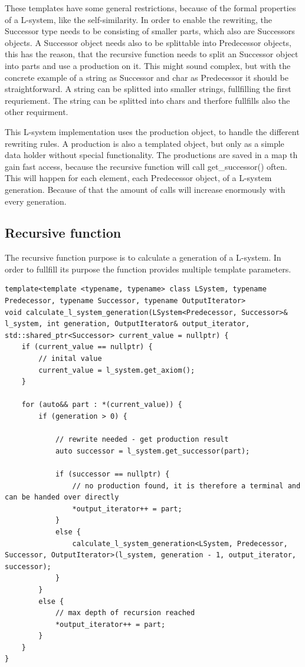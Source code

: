 \documentclass[english]{cpp-hmwk}
\begin{document}
\noindent These templates have some general restrictions, because of the formal properties of a L-system, like the self-similarity. In order to enable the rewriting, the Successor type needs to be consisting of smaller parts, which also are Successors objects. A Successor object needs also to be splittable into Predecessor objects, this has the reason, that the recursive function needs to split an Successor object into parts and use a production on it.
This might sound complex, but with the concrete example of a string as Successor and char as Predecessor it should be straightforward. A string can be splitted into smaller strings, fullfilling the first requriement. The string can be splitted into chars and therfore fullfills also the other requirment.

This L-system implementation uses the production object, to handle the different rewriting rules. A production is also a templated object, but only as a simple data holder without special functionality. The productions are saved in a map th gain fast access, because the recursive function will call get\_successor() often. This will happen for each element, each Predecessor object, of a L-system generation. Because of that the amount of calls will increase enormously with every generation.

\subsection{Recursive function}
The recursive function purpose is to calculate a generation of a L-system. In order to fullfill its purpose the function provides multiple template parameters.

\medskip
\begin{lstlisting}
template<template <typename, typename> class LSystem, typename Predecessor, typename Successor, typename OutputIterator>
void calculate_l_system_generation(LSystem<Predecessor, Successor>& l_system, int generation, OutputIterator& output_iterator, std::shared_ptr<Successor> current_value = nullptr) {
    if (current_value == nullptr) {
        // inital value
        current_value = l_system.get_axiom();
    }

    for (auto&& part : *(current_value)) {
        if (generation > 0) {
        
            // rewrite needed - get production result
            auto successor = l_system.get_successor(part);

            if (successor == nullptr) {
                // no production found, it is therefore a terminal and can be handed over directly
                *output_iterator++ = part;
            }
            else {
                calculate_l_system_generation<LSystem, Predecessor, Successor, OutputIterator>(l_system, generation - 1, output_iterator, successor);
            }
        }
        else {
            // max depth of recursion reached
            *output_iterator++ = part;
        }
    }
}

\end{lstlisting}
\end{document}
